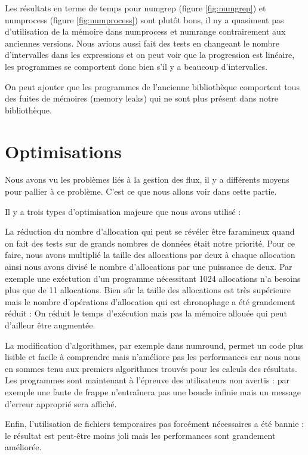Les r\'esultats en terme de temps pour numgrep (figure \ref{fig:numgrep}) et numprocess (figure \ref{fig:numprocess}) sont plut\^ot bons, il ny a quasiment pas d'utilisation de la m\'emoire dans numprocess et numrange contrairement aux anciennes versions. 
Nous avions aussi fait des tests en changeant le nombre d'intervalles dans les expressions et on peut voir que la progression est lin\'eaire, les programmes se comportent donc bien s'il y a beaucoup d'intervalles.

On peut ajouter que les programmes de l'ancienne biblioth\`eque comportent tous des fuites de m\'emoires (memory leaks) qui ne sont plus pr\'esent 
dans notre biblioth\`eque.

\section{Optimisations}

Nous avons vu les probl\`emes li\'es \`a la gestion des flux, il y a diff\'erents moyens pour pallier \`a ce probl\`eme.
C'est ce que nous allons voir dans cette partie.

Il y a trois types d'optimisation majeure que nous avons utilis\'e :

La r\'eduction du nombre d'allocation qui peut se r\'ev\'eler \^etre faramineux quand on fait des tests sur de grands nombres de donn\'ees \'etait notre priorit\'e.
Pour ce faire, nous avons multipli\'e la taille des allocations par deux \`a chaque allocation ainsi nous avons divis\'e le nombre d'allocations par une puissance de deux.
Par exemple une ex\'ectution d'un programme n\'ecessitant 1024 allocations n'a besoins plus que de 11 allocations. Bien s\^ur la taille des allocations est tr\`es sup\'erieure mais le nombre d'op\'erations d'allocation qui est chronophage a \'et\'e grandement r\'eduit :
On r\'eduit le temps d'ex\'ecution mais pas la m\'emoire allou\'ee qui peut d'ailleur \^etre augment\'ee.

La modification d'algorithmes, par exemple dans numround, permet un code plus lisible et facile \`a comprendre mais n'am\'eliore pas les performances car nous nous en sommes tenu aux premiers algorithmes trouv\'es pour les calculs des r\'esultats.
Les programmes sont maintenant \`a l'\'epreuve des utilisateurs non avertis : par exemple une faute de frappe n'entra\^inera pas une boucle infinie mais un message d'erreur appropri\'e sera affich\'e.

Enfin, l'utilisation de fichiers temporaires pas forc\'ement n\'ecessaires a \'et\'e bannie : le r\'esultat est peut-\^etre moins joli mais les performances sont grandement am\'elior\'ee.

